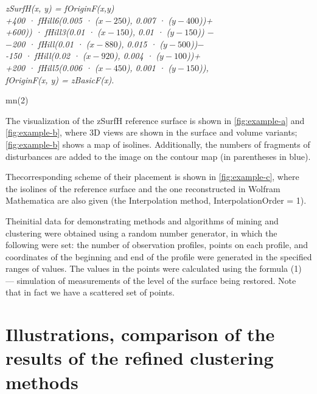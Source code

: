 \documentclass[8pt, a4paper]{article} %
\begin{document}
\begin{multicols}{2}
\quad
\fontsize{10}{14}
\selectfont 
\begin{center}
\textit{zSurfH(x, y) = fOriginF(x,y)\\+400 · fHill6(0.005 · ($x-250$), 0.007 · ($y-400$))+\\
+600)) · fHill3(0.01 · ($x-150$), 0.01 · ($y-150$)) $-$\\ $-$200 · fHill(0.01 · ($x-880$), 0.015 · ($y-500$))$-$ \\ -150 · fHill(0.02 · ($x-920$), 0.004 · ($y-100$))+ \\ +200 · fHill5(0.006 · ($x-450$), 0.001 · ($y-150$)), \\ fOriginF(x, y) = zBasicF(x).}
\end{center}

\begin{flushright}
 {m}{n}{{(2)}}
\end{flushright}

\fontsize{10}{14}
\selectfont 
\quad
The visualization of the zSurfH reference surface is shown in \autoref{fig:example-a} and \ref{fig:example-b}, where 3D views are shown in the surface and volume variants; \autoref{fig:example-b} shows a map of isolines. Additionally, the numbers of fragments of disturbances are added to the image on the contour map (in parentheses in blue).

\fontsize{10}{14}
\selectfont 
\quad Thecorresponding scheme of their placement is shown in \autoref{fig:example-c}, where the isolines of the reference surface
and the one reconstructed in Wolfram Mathematica are also given (the Interpolation method, InterpolationOrder
= 1).

\fontsize{10}{14}
\selectfont 
\quad Theinitial data for demonstrating methods and algorithms of mining and clustering were obtained using a
random number generator, in which the following were set: the number of observation profiles, points on each
profile, and coordinates of the beginning and end of the profile were generated in the specified ranges of values. The values in the points were calculated using
the formula (1) — simulation of measurements of the level of the surface being restored. Note that in fact we
have a scattered set of points.

\fontsize{10}{14}
\selectfont
\section{\textbf {Illustrations, comparison of the results of the refined clustering methods}}


\end{multicols}
\end{document}
